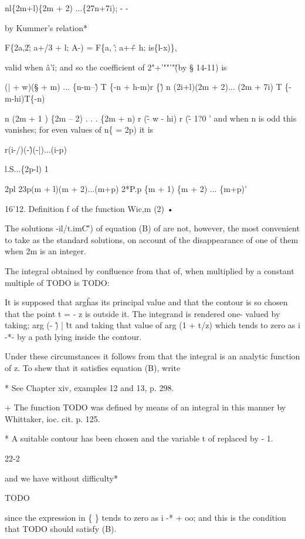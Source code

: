 nl\{2m+l)\{2m + 2) ...\{27n+7i); - -

by Kummer's relation*

F\{2a,2\^; a+/3 + l; A-) = F\{a, \^; a+\^ + h; is\{l-x)\},

valid when \^a'\^ i; and so the coefficient of 2"+'""'"\^ (by §
14-11) is

(| + w)(§ + m) ... \{n-m--\^ ) T \{-n + h-m)r \{\^ ) n (2i+l)(2m +
2)... (2m + 7i) T \{-m-hi)T\{-n)

n (2m + 1 ) \{2m -- 2) . . . \{2m + n) r (\^ - w - hi) r (\^ - 1?0 '
and when n is odd this vanishes; for even values of n\{ = 2p) it is

r(i-/)(-\^)(-|)...(i-p)

l.S...\{2p-l) 1

2pl 23p(m + l)(m + 2)...(m+p) 2*P.p \{m + 1) \{m + 2) ... \{m+p)'

16'12. Definition f of the function Wic,m (2) •

The solutions -il/t.imC\^') of equation (B) of are not,
however, the most convenient to take as the standard solutions, on
account of the disappearance of one of them when 2m is an integer.

The integral obtained by confluence from that of, when
multiplied by a constant multiple of TODO is TODO:

It is supposed that arg\^ has its principal value and that the contour
is so chosen that the point t = - z is outside it. The integrand is
rendered one- valued by taking; arg (- \^) | \^ tt and taking that
value of arg (1 + t/z) which tends to zero as i -*- by a path lying
inside the contour.

Under these circumstances it follows from that the integral is
an analytic function of z. To shew that it satisfies equation (B),
write

* See Chapter xiv, examples 12 and 13, p. 298.

+ The function TODO was defined by means of an integral in this manner
by Whittaker, ioc. cit. p. 125.

* A suitable contour has been chosen and the variable t of
replaced by - 1.

22-2

%
%

and we have without difficulty*

TODO

since the expression in \{ \} tends to zero as i -* + oo; and this is
the condition that TODO should satisfy (B).

